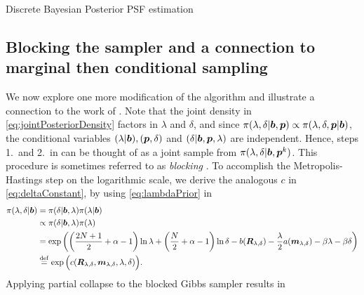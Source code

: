 \begin{chapter}{Discrete Bayesian Posterior PSF estimation}
\subsection{Blocking the sampler and a connection to marginal then conditional sampling}

We now explore one more modification of the algorithm and illustrate a connection to the work of \citep{fox2015fast}.
Note that the joint density in \eqref{eq:jointPosteriorDensity} factors in $\lambda$ and $\delta$, and since $\pi(\lambda,\delta|\mbox{\boldmath$b$},\mbox{\boldmath$p$}) \propto \pi(\lambda,\delta,\mbox{\boldmath$p$}|\mbox{\boldmath$b$})$, the conditional variables $(\lambda|\mbox{\boldmath$b$}), (\mbox{\boldmath$p$},\delta)$ and $(\delta|\mbox{\boldmath$b$},\mbox{\boldmath$p$},\lambda)$ are independent.
Hence, steps 1.~and 2.~in  can be thought of as a joint sample from $\pi(\lambda,\delta|\mbox{\boldmath$b$},\mbox{\boldmath$p$}^k)$.
This procedure is sometimes referred to as \emph{blocking} \citep{liu2008monte}.
To accomplish the Metropolis-Hastings step on the logarithmic scale, we derive the analogous $c$ in \eqref{eq:deltaConstant}, by using \eqref{eq:lambdaPrior} in
\begin{align}
  \pi(\lambda,\delta|\mbox{\boldmath$b$}) 
    &=\pi(\delta|\mbox{\boldmath$b$},\lambda)\pi(\lambda|\mbox{\boldmath$b$}) \nonumber\\
    &\propto \pi(\delta|\mbox{\boldmath$b$},\lambda)\pi(\lambda) \nonumber\\
    &= \exp\left( \left(\frac {2N+1}2 +\alpha - 1\right)\ln\lambda + \left(\frac N2 +\alpha - 1\right)\ln\delta - b(\mbox{\boldmath$R$}_{\lambda,\delta}) -\frac \lambda 2 a(\mbox{\boldmath$m$}_{\lambda,\delta}) -\beta\lambda -\beta\delta  \right)\nonumber \\
    &\stackrel{\rm def}{=} \exp\Big(c(\mbox{\boldmath$R$}_{\lambda,\delta},\mbox{\boldmath$m$}_{\lambda,\delta},\lambda,\delta)\Big). \label{eq:jointConstant}
\end{align}
Applying partial collapse to the blocked Gibbs sampler results in 


\end{chapter}
